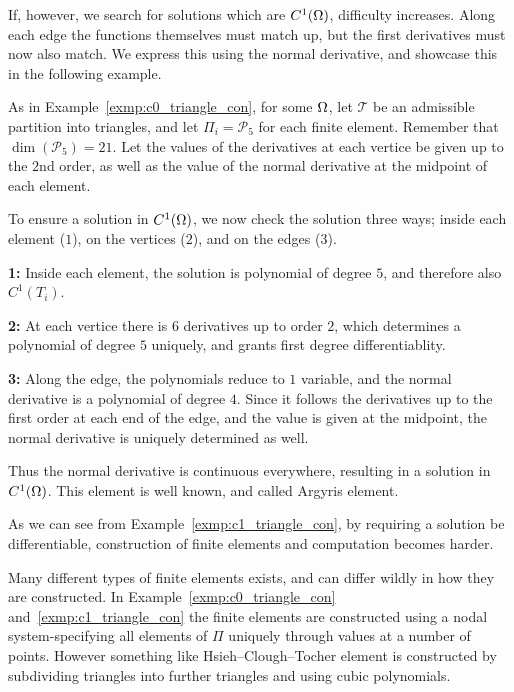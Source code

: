 If, however, we search for solutions which 
are $C^1(\Omega)$, difficulty increases. Along each edge the functions 
themselves must match up, but the first derivatives must now also match. 
We express this using the normal derivative, and showcase this in the 
following example. 
\begin{exmp}{\quad\label{exmp:c1_triangle_con}}
   As in Example~\ref{exmp:c0_triangle_con}, 
    for some $\Omega$, let $\mathcal{T}$ be an admissible partition into 
    triangles, and let $\Pi_i = \mathcal{P}_5$ for each finite element.
    Remember that $\dim(\mathcal{P}_5) = 21$.
    Let the values of the derivatives at each vertice be given up 
    to the $2$nd order, as well as the value of the normal derivative at the 
    midpoint of each element.
    
    To ensure a solution in $C^1(\Omega)$, 
    we now check the solution three ways; inside each element ($1$), 
    on the vertices ($2$), and on the edges ($3$).
    \iffalse
    we now check the solution three ways:
    \begin{enumerate}
        \item Inside each element
        \item On the vertices
        \item On the edges
    \end{enumerate} 
    \fi

    \textbf{1:} Inside each element, the solution is polynomial of degree $5$, 
    and therefore also $C^1(T_i)$.

    \textbf{2:} At each vertice there is $6$ derivatives up to order $2$, which 
    determines a polynomial of degree $5$ uniquely, and grants first 
    degree differentiablity.

    \textbf{3:} Along the edge, the polynomials reduce to $1$ variable, and the 
    normal derivative is a polynomial of degree $4$. Since it follows 
    the derivatives up to the first order at each end of the edge, and 
    the value is given at the midpoint, the normal derivative is uniquely 
    determined as well.

    Thus the normal derivative is continuous everywhere, resulting in a 
    solution in $C^1(\Omega)$. This element is well known, and called 
    Argyris element.
\end{exmp}
As we can see from Example~\ref{exmp:c1_triangle_con}, by requiring a 
solution be differentiable, construction of finite elements and computation 
becomes harder. 

Many different types of finite elements exists, and can differ wildly in how they 
are constructed. In Example~\ref{exmp:c0_triangle_con} and~\ref{exmp:c1_triangle_con} 
the finite elements are constructed using a nodal system-specifying all elements of $\Pi$ 
uniquely through values at a number of points. However something like Hsieh–Clough–Tocher element 
is constructed by subdividing triangles into further triangles and using 
cubic polynomials.

